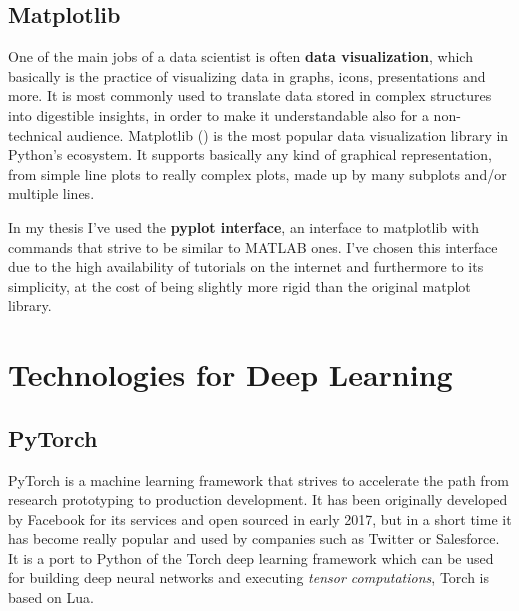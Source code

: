 \documentclass[11pt,a4paper,titlepage]{book}
\begin{document}
\subsection{Matplotlib}
\begin{figure}
    \centering
    
\end{figure}
One of the main jobs of a data scientist is often \textbf{data visualization}, which basically is the practice of visualizing data in graphs, icons, presentations and more. It is most commonly used to translate data stored in complex structures into digestible insights, in order to make it understandable also for a non-technical audience.
\newline
\newline
Matplotlib (\cite{plot}) is the most popular data visualization library in Python's ecosystem. It supports basically any kind of graphical representation, from simple line plots to really complex plots, made up by many subplots and/or multiple lines.

In my thesis I've used the \textbf{pyplot interface}, an interface to matplotlib with commands that strive to be similar to MATLAB ones.
\newline
\newline
I've chosen this interface due to the high availability of tutorials on the internet and furthermore to its simplicity, at the cost of being slightly more rigid than the original matplot library. 

\section{Technologies for Deep Learning}
\subsection{PyTorch}
\label{pytorch:intro}
\begin{figure}
    \centering
    
\end{figure}
PyTorch \cite{pytorch-home} is a machine learning framework that strives to accelerate the path from research prototyping to production development. It has been originally developed by Facebook for its services and open sourced in early 2017, but in a short time it has become really popular and used by companies such as Twitter or Salesforce.
\newline
\newline
It is a port to Python of the Torch deep learning framework which can be used for building deep neural networks and executing \textit{tensor computations}, Torch is based on Lua.
\end{document}
